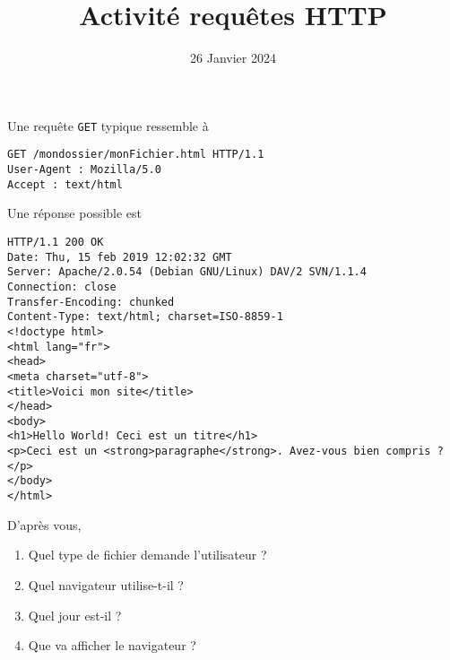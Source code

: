 \documentclass{article}
\title{Activité requêtes HTTP}
\date{26 Janvier 2024}
\author{}
\begin{document}
\maketitle
Une requête \verb|GET| typique ressemble à

\begin{verbatim}
GET /mondossier/monFichier.html HTTP/1.1
User-Agent : Mozilla/5.0
Accept : text/html
\end{verbatim}

Une réponse possible est 

\begin{verbatim}
HTTP/1.1 200 OK
Date: Thu, 15 feb 2019 12:02:32 GMT
Server: Apache/2.0.54 (Debian GNU/Linux) DAV/2 SVN/1.1.4
Connection: close
Transfer-Encoding: chunked
Content-Type: text/html; charset=ISO-8859-1
<!doctype html>
<html lang="fr">
<head>
<meta charset="utf-8">
<title>Voici mon site</title>
</head>
<body>
<h1>Hello World! Ceci est un titre</h1>
<p>Ceci est un <strong>paragraphe</strong>. Avez-vous bien compris ?</p>
</body>
</html>
\end{verbatim}

D'après vous,
\begin{enumerate}[label = \emph{\alph*)}]
\item Quel type de fichier demande l'utilisateur ?
\item Quel navigateur utilise-t-il ?
\item Quel jour est-il ?
\item Que va afficher le navigateur ? 
\end{enumerate}
\end{document}
